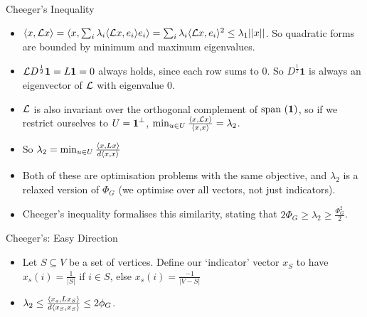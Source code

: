\documentclass[presentation]{beamer}
\begin{document}
\begin{frame}[label={sec:orgd2dbab9}]{Cheeger's Inequality}
\begin{itemize}
\item \(\langle x , \mathcal{L} x \rangle=\langle x , \sum_i \lambda_i\langle \mathcal{L} x , e_i \rangle e_i \rangle=\sum_i \lambda_i\langle \mathcal{L} x , e_i \rangle^2 \le \lambda_1 ||x||\). So quadratic forms are bounded by minimum and maximum eigenvalues.
\item \(\mathcal{L} D^{\frac12}\textbf{1}=L \textbf{1}=0\) always holds, since each row sums to \(0\). So \(D^{\frac12}\textbf{1}\) is always an eigenvector of \(\mathcal{L}\) with eigenvalue \(0\).
\item \(\mathcal{L}\) is also invariant over the orthogonal complement of \(\text{span }(\textbf{1})\), so if we restrict ourselves to \(U=\textbf{1}^{\perp}\), \(\min_{u \in U}\frac{\langle x , \mathcal{L} x \rangle}{\langle x , x \rangle}=\lambda_2\).
\item So \(\lambda_2=\min_{u \in U}\frac{\langle x , Lx \rangle}{d\langle x , x \rangle}\)
\item Both of these are optimisation problems with the same objective, and \(\lambda_2\) is a relaxed version of \(\Phi_G\) (we optimise over all vectors, not just indicators).
\item Cheeger's inequality formalises this similarity, stating that \(2 \Phi_G \ge \lambda_2 \ge \frac{\Phi_{G}^{2}}{2}\).
\end{itemize}
\end{frame}
\begin{frame}[label={sec:orgaf6acc1}]{Cheeger's: Easy Direction}
\begin{itemize}
\item Let \(S \subseteq V\) be a set of vertices. Define our `indicator' vector \(x_S\) to have \(x_s(i)=\frac{1}{|S|}\) if \(i \in S\), else \(x_s(i)=\frac{-1}{|V-S|}\)
\item \(\lambda_2 \le \frac{\langle x_s , Lx_S \rangle}{d\langle x_S , x_S \rangle} \le 2\phi_G\).
\end{itemize}
\end{frame}
\end{document}
